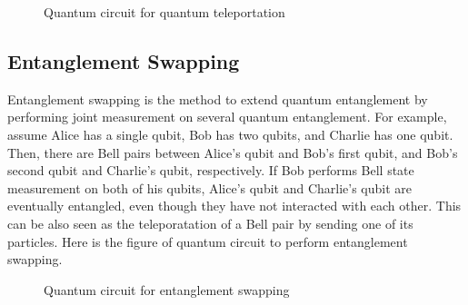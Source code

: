 \begin{figure}[ht]
  	\begin{center}
	\caption{Quantum circuit for quantum teleportation}
	\end{center}
\end{figure}

\newpage

\subsection{Entanglement Swapping}

Entanglement swapping is the method to extend quantum entanglement by performing joint measurement on several quantum entanglement.
For example, assume Alice has a single qubit, Bob has two qubits, and Charlie has one qubit. Then, there are Bell pairs between Alice's qubit and Bob's first qubit, and Bob's second qubit and Charlie's qubit, respectively.
If Bob performs Bell state measurement on both of his qubits, Alice's qubit and Charlie's qubit are eventually entangled, even though they have not interacted with each other.
This can be also seen as the teleporatation of a Bell pair by sending one of its particles.
Here is the figure of quantum circuit to perform entanglement swapping.

\begin{figure}[ht]
  \begin{center}
\caption{Quantum circuit for entanglement swapping}
\end{center}
\end{figure}


